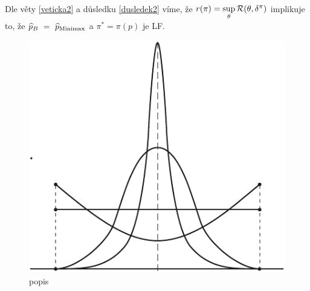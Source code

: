 \begin{example}
\begin{enumerate}[1)]
\begin{enumerate}[a)]
\[\begin{split}
			\end{split}
			\] 
			Dle věty \ref{veticka2} a důsledku \ref{dusledek2} víme, že $r(\pi)=\sup\limits_{\theta}\mathcal{R}(\theta,\delta^\pi)$ implikuje to, že $\widehat{p}_B~=~\widehat{p}_\mathrm{Minimax}$ a $\pi^\ast=\pi(p)$ je LF.
			\begin{figure}[h]
				\centering
				\includegraphics[width=0.5\linewidth]{pictures/9_1.pdf}
				\caption{popis}
				\label{fig:91}
			\end{figure}			
		\end{enumerate}
	\end{enumerate}
\end{example}	
	
